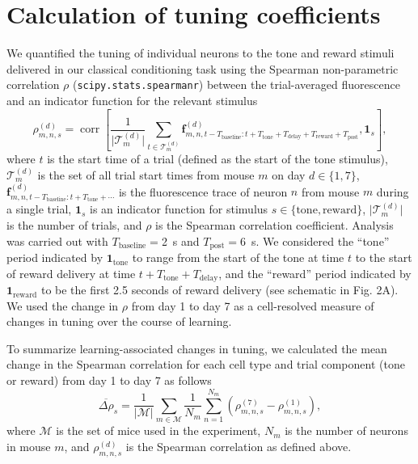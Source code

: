 \documentclass{article}
\DeclareMathOperator{\corr}{corr}
\begin{document}
\section{Calculation of tuning coefficients}

We quantified the tuning of individual neurons to the tone and reward stimuli
delivered in our classical conditioning task using the Spearman non-parametric
correlation $\rho$ (\texttt{scipy.stats.spearmanr}) between the trial-averaged
fluorescence and an indicator function for the relevant stimulus
\begin{equation}
    \rho_{m,n,s}^{(d)} =
    \corr\left[\frac{1}{\lvert \mathcal{T}_{m}^{(d)} \rvert}
    \sum_{t \in
    \mathcal{T}_{m}^{(d)}}
    \mathbf{f}_{m,n,t - T_\text{baseline}:t+T_\text{tone}
    + T_\text{delay} + T_\text{reward} + T_\text{post}}^{(d)},
    \mathbf{1}_s\right],
\end{equation}
where $t$ is the start time of a trial (defined as the start of the tone
stimulus), $\mathcal{T}_{m}^{(d)}$ is the set of all trial start times from
mouse $m$ on day $d \in \{1, 7\}$,
$\mathbf{f}_{m,n,t-T_\text{baseline}:t+T_\text{tone} + \cdots}^{(d)}$ is the
fluorescence trace of neuron $n$ from mouse $m$ during a single trial, $\mathbf{1}_s$ is an indicator function for stimulus $s \in \{\text{tone},
\text{reward}\}$, $\lvert \mathcal{T}_{m}^{(d)} \rvert$ is the number of trials,
and $\rho$ is the Spearman correlation coefficient.  Analysis was carried out
with $T_\text{baseline} =$\SI{2}{\s} and $T_\text{post} =$\SI{6}{\s}.  We
considered the ``tone'' period indicated by $\mathbf{1}_\text{tone}$ to range
from the start of the tone at time $t$ to the start of reward delivery at time
$t + T_\text{tone} + T_\text{delay}$, and the ``reward'' period indicated by
$\mathbf{1}_\text{reward}$ to be the first 2.5 seconds of reward delivery (see
schematic in Fig. 2A). We used the change in $\rho$ from day 1 to day 7 as a
cell-resolved measure of changes in tuning over the course of learning.

To summarize learning-associated changes in tuning, we calculated the mean
change in the Spearman correlation for each cell type and trial component (tone
or reward) from day 1 to day 7 as follows
\begin{equation}
    \overline{\Delta\rho}_{s} = \frac{1}{\lvert \mathcal{M} \rvert} \sum_{m \in \mathcal{M}} \frac{1}{N_m} \sum_{n=1}^{N_m}
    \left(\rho_{m,n,s}^{(7)} - \rho_{m,n,s}^{(1)}\right),
\end{equation}
where $\mathcal{M}$ is the set of mice used in the experiment, $N_m$ is the
number of neurons in mouse $m$, and $\rho_{m,n,s}^{(d)}$ is the Spearman
correlation as defined above.
\end{document}
